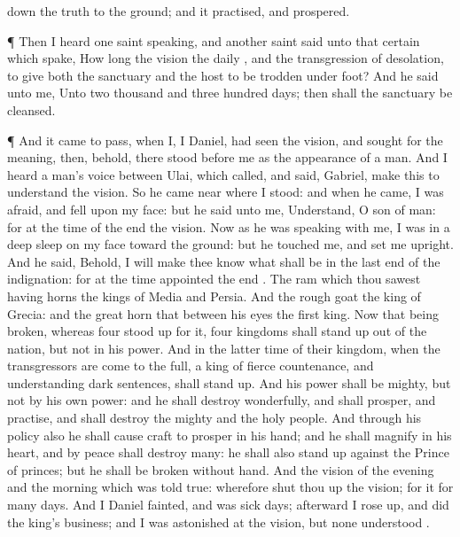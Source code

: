 {down the
truth to the
ground; and it
practised, and
prospered.
\par }{\PP {}¶ Then I
heard
one
saint
speaking, and
another
saint
said unto that
certain
{} which
spake, How long
{} the
vision
{} the
daily
{}, and the
transgression of
desolation, to
give both the
sanctuary and the
host to be trodden under
foot?
And he
said unto me, Unto two
thousand and
three
hundred
days; then shall the
sanctuary be
cleansed.
\par }{\PP {}¶ And it came to pass, when I,
{} I
Daniel, had
seen the
vision, and
sought for the
meaning, then, behold, there
stood before me as the
appearance of a
man.
And I
heard a
man’s
voice between
{}
Ulai, which
called, and
said,
Gabriel, make
this
{} to
understand the
vision.
So he
came
near where I
stood: and when he
came, I was
afraid, and
fell upon my
face: but he
said unto me,
Understand, O
son of
man: for at the
time of the
end
{} the
vision.
Now as he was
speaking with me, I was in a deep
sleep on my
face toward the
ground: but he
touched me, and
set me
upright.
And he
said, Behold, I will make thee
know what shall be in the last
end of the
indignation: for at the time
appointed the
end
{}.
The
ram which thou
sawest
having
{}
horns
{} the
kings of
Media and
Persia.
And the
rough
goat
{} the
king of
Grecia: and the
great
horn that
{} between his
eyes
{} the
first
king.
Now that being
broken, whereas
four stood
up for it,
four
kingdoms shall stand
up out of the
nation, but not in his
power.
And in the latter
time of their
kingdom, when the
transgressors are come to the
full, a
king of
fierce
countenance, and
understanding dark
sentences, shall stand
up.
And his
power shall be
mighty, but not by his own
power: and he shall
destroy
wonderfully, and shall
prosper, and
practise, and shall
destroy the
mighty and the
holy
people.
And through his
policy also he shall cause
craft to
prosper in his
hand; and he shall
magnify
{} in his
heart, and by
peace shall
destroy
many: he shall also stand
up against the
Prince of
princes; but he shall be
broken
without
hand.
And the
vision of the
evening and the
morning which was
told
{}
true: wherefore shut thou
up the
vision; for it
{} for
many
days.
And I
Daniel
fainted, and was
sick
{}
days; afterward I rose
up, and
did the
king’s
business; and I was
astonished at the
vision, but none
understood
{}.

}
